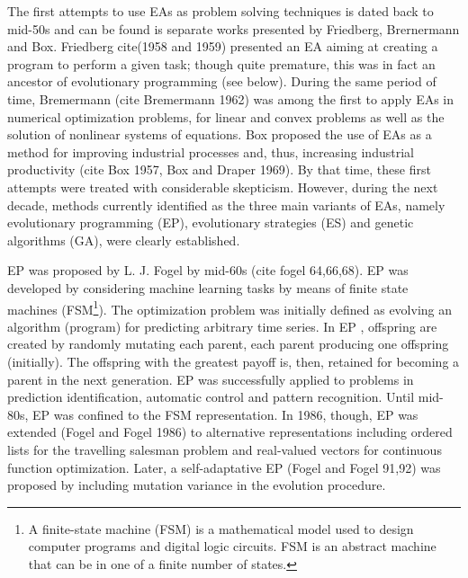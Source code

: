 The first attempts to use EAs as problem solving techniques is dated back to mid-50s and can be found is separate works presented by Friedberg, Brernermann and Box. Friedberg cite(1958 and 1959) presented an EA aiming at creating a program to perform a given task; though quite premature, this was in fact an ancestor of evolutionary programming (see below). During the same period of time, Bremermann (cite Bremermann 1962) was among the first to apply EAs in numerical optimization problems, for linear and convex problems as well as the solution of nonlinear systems of equations. Box proposed the use of EAs as a method for improving industrial processes and, thus, increasing industrial productivity (cite Box 1957, Box and Draper 1969). By that time, these first attempts were treated with considerable skepticism. However, during the next decade, methods currently identified as the three main variants of EAs, namely evolutionary programming (EP), evolutionary strategies (ES) and genetic algorithms (GA), were clearly established.

EP was proposed by L. J. Fogel by mid-60s  (cite fogel 64,66,68). EP was developed by considering machine learning tasks by means of finite state machines (FSM\footnote{A finite-state machine (FSM) is a mathematical model used to design computer programs and digital logic circuits. FSM is an abstract machine that can be in one of a finite number of states.}). The optimization problem was  initially defined as evolving an algorithm (program) for predicting arbitrary time series.  In EP  \cite{Fogel}, offspring are created by randomly mutating each parent, each parent producing one offspring (initially). The offspring with the greatest payoff is, then, retained for becoming a parent in the next generation. EP was successfully applied to problems in prediction identification, automatic control and pattern recognition. Until mid-80s, EP was confined to the FSM representation. In 1986, though, EP was extended (Fogel and Fogel 1986) to alternative representations including ordered lists for the travelling salesman problem and real-valued vectors for continuous function optimization. Later, a self-adaptative EP (Fogel and Fogel 91,92) was proposed by including mutation variance in the evolution procedure.

